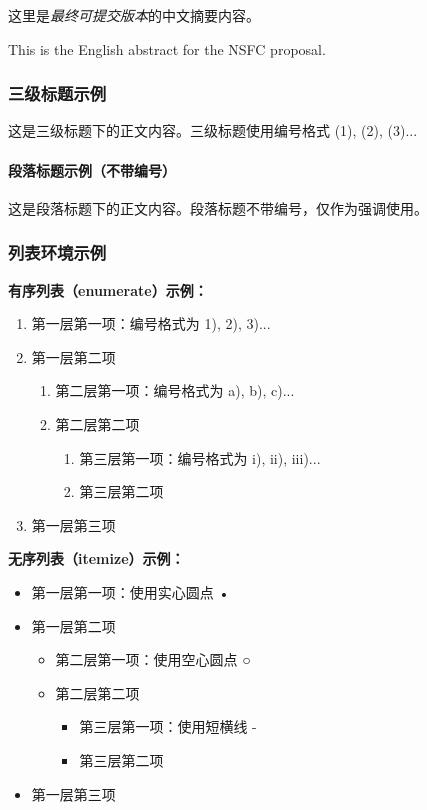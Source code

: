 \documentclass[UTF8,zihao=-4]{ctexart} %
\begin{document}
   \mnsfcTitlePage
   \begin{mnsfcAbstractZH}
     这里是\emph{最终可提交版本}的中文摘要内容。
   \end{mnsfcAbstractZH}

   \begin{mnsfcAbstractEN}
     This is the English abstract for the NSFC proposal.
   \end{mnsfcAbstractEN}

  \zhlipsum[1-2]
   \subsubsection{三级标题示例}
   这是三级标题下的正文内容。三级标题使用编号格式 (1), (2), (3)...

   \paragraph{段落标题示例（不带编号）}
   这是段落标题下的正文内容。段落标题不带编号，仅作为强调使用。

   \subsubsection{列表环境示例}

   \textbf{有序列表（enumerate）示例：}
   \begin{enumerate}
     \item 第一层第一项：编号格式为 1), 2), 3)...
     \item 第一层第二项
     \begin{enumerate}
       \item 第二层第一项：编号格式为 a), b), c)...
       \item 第二层第二项
       \begin{enumerate}
         \item 第三层第一项：编号格式为 i), ii), iii)...
         \item 第三层第二项
       \end{enumerate}
     \end{enumerate}
     \item 第一层第三项
   \end{enumerate}

   \textbf{无序列表（itemize）示例：}
   \begin{itemize}
     \item 第一层第一项：使用实心圆点 •
     \item 第一层第二项
     \begin{itemize}
       \item 第二层第一项：使用空心圆点 ○
       \item 第二层第二项
       \begin{itemize}
         \item 第三层第一项：使用短横线 -
         \item 第三层第二项
       \end{itemize}
     \end{itemize}
     \item 第一层第三项
   \end{itemize}
\end{document}
